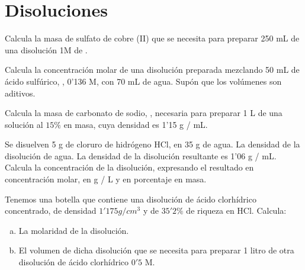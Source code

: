 \section{Disoluciones}

\begin{prob}
Calcula la masa de sulfato de cobre (II) que se necesita para preparar 250 mL de una 
disolución 1M de .
\end{prob}

\begin{prob}
Calcula la concentración molar de una disolución preparada mezclando 50 mL de ácido
sulfúrico, , 0'136 M, con 70 mL de agua. Supón que los volúmenes son aditivos.
\end{prob}

\begin{prob}
Calcula la masa de carbonato de sodio, , necesaria para preparar 1 L de una
solución al $15\%$ en masa, cuya densidad es 1'15 g / mL.
\end{prob}

\begin{prob}
Se disuelven 5 g de cloruro de hidrógeno HCl, en 35 g de agua. La densidad de la
disolución de agua. La densidad de la disolución resultante es 1'06 g / mL. Calcula la
concentración de la disolución, expresando el resultado en concentración molar, en g / L y
en porcentaje en masa.
\end{prob}

\begin{prob}
Tenemos una botella que contiene una disolución de ácido clorhídrico concentrado, de
densidad $1'175 g / cm^3$ y de $35'2\%$ de riqueza en HCl. Calcula:
\begin{enumerate}[a)]
	\item La molaridad de la disolución.
	\item El volumen de dicha disolución que se necesita para preparar 1 litro de otra
	disolución de ácido clorhídrico $0'5$ M.
\end{enumerate}
\end{prob}